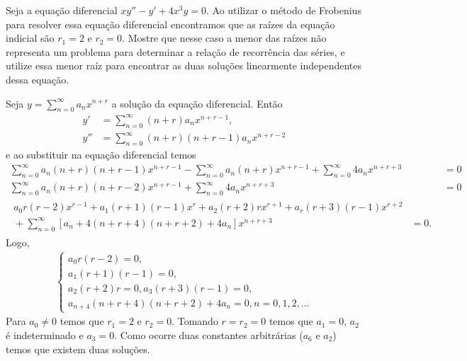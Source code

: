 \documentclass[a4paper,12pt, leqno, answers]{exam}
\begin{document}
\begin{questions}
    \question[P1 de 2011] Seja a equa\c{c}\~{a}o diferencial $x y'' - y' + 4 x^3 y = 0$. Ao utilizar o m\'{e}todo de Frobenius para resolver essa equa\c{c}\~{a}o diferencial encontramos que as ra\'{i}zes da equa\c{c}\~{a}o indicial s\~{a}o $r_1 = 2$ e $r_2 = 0$. Mostre que nesse caso a menor das ra\'{i}zes n\~{a}o representa um problema para determinar a rela\c{c}\~{a}o de recorr\^{e}ncia das s\'{e}ries, e utilize essa menor ra\'{i}z para encontrar as duas solu\c{c}\~{o}es linearmente independentes dessa equa\c{c}\~{a}o.
    \begin{solution}
        Seja $y = \sum_{n = 0}^\infty a_n x^{n + r}$ a solu\c{c}\~{a}o da equa\c{c}\~{a}o diferencial. Ent\~{a}o
        \begin{align*}
            y' &= \sum_{n = 0}^\infty (n + r) a_n x^{n + r - 1}, \\
            y'' &= \sum_{n = 0}^\infty (n + r) (n + r - 1) a_n x^{n + r - 2}
        \end{align*}
        e ao substituir na equa\c{c}\~{a}o diferencial temos
        \begin{align*}
            \sum_{n = 0}^\infty a_n (n + r) (n + r - 1) x^{n + r - 1} - \sum_{n = 0}^\infty a_n (n + r) x^{n + r - 1} + \sum_{n = 0}^\infty 4 a_n x^{n + r + 3} &= 0 \\
            \sum_{n = 0}^\infty a_n (n + r) (n + r - 2) x^{n + r - 1} + \sum_{n = 0}^\infty 4 a_n x^{n + r + 3} &= 0 \\
            \begin{split}
                a_0 r (r - 2) x^{r - 1} + a_1 (r + 1) (r - 1) x^r + a_2 (r + 2) r x^{r + 1} + a_r (r + 3) (r - 1) x^{r + 2} & \\
                {}+ \sum_{n = 0}^\infty \left[ a_n + 4 (n + r + 4) (n + r + 2)  + 4 a_n\right] x^{n + r + 3} &= 0.
            \end{split}
        \end{align*}
        Logo,
        \begin{align*}
            \begin{cases}
                a_0 r (r - 2) = 0, \\
                a_1 (r + 1) (r - 1) = 0, \\
                a_2 (r + 2) r = 0,
                a_3 (r + 3) (r - 1) = 0, \\
                a_{n + 4} (n + r + 4) (n + r + 2) + 4 a_n = 0, n = 0, 1, 2, \ldots
            \end{cases}
        \end{align*}
        Para $a_0 \neq 0$ temos que $r_1 = 2$ e $r_2 = 0$. Tomando $r = r_2 = 0$ temos que $a_1 = 0$, $a_2$ \'{e} indeterminado e $a_3 = 0$. Como ocorre duas constantes arbitr\'{a}rias ($a_6$ e $a_2$) temos que existem duas solu\c{c}\~{o}es.


\end{solution}
\end{questions}
\end{document}
